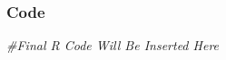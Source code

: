\documentclass[]{report}
\newenvironment{Shaded}{\begin{snugshade}}{\end{snugshade}}
\newcommand{\CommentTok}[1]{\textcolor[rgb]{0.56,0.35,0.01}{\textit{#1}}}
\begin{document}
\hypertarget{code}{%
\subsubsection{Code}\label{code}}

\begin{Shaded}
\begin{Highlighting}[]
\CommentTok{#Final R Code Will Be Inserted Here}
\end{Highlighting}
\end{Shaded}
\end{document}
